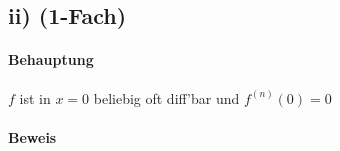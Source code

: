 \subsection*{ii) (1-Fach)}

\paragraph*{Behauptung}

$f$ ist in $x = 0$ beliebig oft diff'bar und $f^{(n)}(0) = 0$

\paragraph*{Beweis}



	